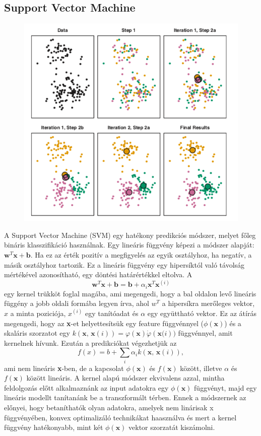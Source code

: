 \documentclass[12pt]{article}
\theoremstyle{plain}
\begin{document}
\subsection{Support Vector Machine}
\begin{figure}
    \begin{center}
    \includegraphics[width=1\textwidth]{media/kmeans.png}
    \caption{} 
    \label{kmeans}
    \end{center}
\end{figure}
A Support Vector Machine (SVM) egy hatékony predikciós módszer, melyet főleg bináris klasszifikáció használnak. Egy lineáris függvény képezi a módszer alapját: 
$ \textbf{w}^T\textbf{x}+\textbf{b}. $ Ha ez az érték pozitív a megfigyelés az egyik osztályhoz, ha negatív, a másik osztályhoz tartozik. Ez a lineáris függvény egy hipersíktól való távolság mértékével azonosítható, egy döntési határértékkel eltolva. A $$ \textbf{w}^T\textbf{x}+\textbf{b}=\textbf{b}+\alpha_i \textbf{x}^T \textbf{x}^{(i)}$$ egy kernel trükköt foglal magába, ami megengedi, hogy a bal oldalon levő lineáris függény a jobb oldali formába legyen írva, ahol $w^T$ a hipersíkra merőleges vektor, $x$ a minta poziciója, $x^{(i)}$ egy tanítóadat és $\alpha$ egy együttható vektor. Ez az átírás megengedi, hogy az \textbf{x}-et helyettesítsük egy feature függvénnyel ($\phi(\textbf{x})$) és a skaláris szorzatot egy $k(\textbf{x, x}(i)) = φ(\textbf{x}) \dot φ(\textbf{x(}i))$ függvénnyel, amit kernelnek hívunk.  Ezután a predikciókat végezhetjük az $$ f(x)= b + \sum_i \alpha_i k(\textbf{x, x}(i)),$$ ami nem lineáris \textbf{x}-ben, de a kapcsolat $\phi(\textbf{x}) $ és $f(\textbf{x})$ között, illetve $\alpha$ és $f(\textbf{x}) $ között lineáris. A kernel alapú módszer ekvivalens azzal, mintha feldolgozás előtt alkalmaznánk az input adatokra egy $\phi(\textbf{x})$ függvényt, majd egy lineáris modellt tanítanánk be a transzformált térben. Ennek a módszernek az előnyei, hogy betaníthatók olyan adatokra, amelyek nem linárisak x függvényében, konvex optimalizáló technikákat haasználva és mert a kernel függvény hatékonyabb, mint két $\phi(\textbf{x}) $ vektor szorzatát kiszámolni. 
\end{document}
